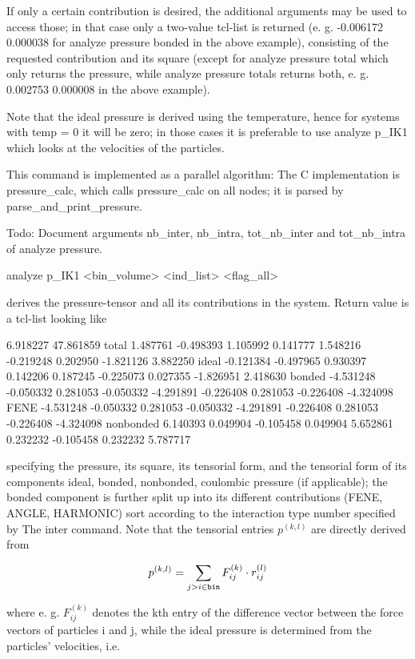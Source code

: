 {If only a certain contribution is desired, the additional arguments may be used to access those; in that case only a two-value tcl-list is returned (e. g. -0.006172 0.000038 for analyze pressure bonded in the above example), consisting of the requested contribution and its square (except for analyze pressure total which only returns the pressure, while analyze pressure totals returns both, e. g. 0.002753 0.000008 in the above example).

Note that the ideal pressure is derived using the temperature, hence for systems with temp = 0 it will be zero; in those cases it is preferable to use analyze p\_IK1 which looks at the velocities of the particles.

This command is implemented as a parallel algorithm: The C implementation is pressure\_calc, which calls pressure\_calc on all nodes; it is parsed by parse\_and\_print\_pressure.

Todo:
 Document arguments nb\_inter, nb\_intra, tot\_nb\_inter and tot\_nb\_intra of analyze pressure. 
\begin{tclcode}
 analyze p_IK1 <bin_volume> <ind_list> <flag_all>
\end{tclcode}
derives the pressure-tensor and all its contributions in the system. Return value is a tcl-list looking like

6.918227 47.861859 { total 1.487761 -0.498393 1.105992 0.141777 1.548216 -0.219248 0.202950 -1.821126 3.882250 } { ideal -0.121384 -0.497965 0.930397 0.142206 0.187245 -0.225073 0.027355 -1.826951 2.418630 } { bonded -4.531248 -0.050332 0.281053 -0.050332 -4.291891 -0.226408 0.281053 -0.226408 -4.324098 { FENE -4.531248 -0.050332 0.281053 -0.050332 -4.291891 -0.226408 0.281053 -0.226408 -4.324098 } } { nonbonded 6.140393 0.049904 -0.105458 0.049904 5.652861 0.232232 -0.105458 0.232232 5.787717 } 

specifying the pressure, its square, its tensorial form, and the tensorial form of its components ideal, bonded, nonbonded, coulombic pressure (if applicable); the bonded component is further split up into its different contributions (FENE, ANGLE, HARMONIC) sort according to the interaction type number specified by The inter command. Note that the tensorial entries $ p^{(k,l)} $ are directly derived from

\[ p^{(k,l)} = \sum_{j>i\in {\tt bin}} F_{ij}^{(k)} \cdot r_{ij}^{(l)} \]

where e. g. $ F_{ij}^{(k)} $ denotes the kth entry of the difference vector between the force vectors of particles i and j, while the ideal pressure is determined from the particles' velocities, i.e.

}
